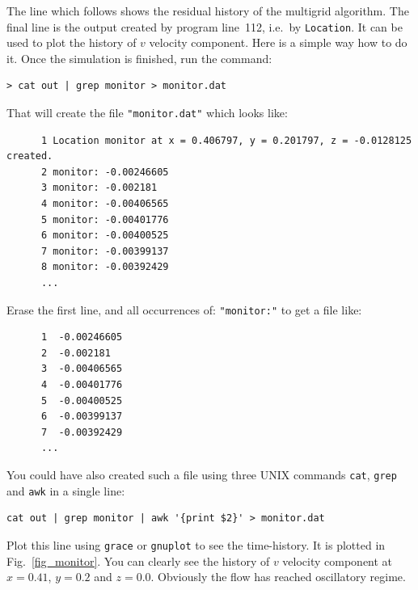 The line which follows shows the residual history of the multigrid algorithm.
The final line is the output created by program line~112, i.e.\ by {\tt Location}.
It can be used to plot the history of $v$ velocity component. 
%
Here is 
a simple way how to do it. Once the simulation is finished, run the 
command:
%
\begin{verbatim}
> cat out | grep monitor > monitor.dat
\end{verbatim}
%
That will create the file {\tt "monitor.dat"} which looks like:
%
{\small \begin{verbatim}
      1 Location monitor at x = 0.406797, y = 0.201797, z = -0.0128125 created.
      2 monitor: -0.00246605
      3 monitor: -0.002181
      4 monitor: -0.00406565
      5 monitor: -0.00401776
      6 monitor: -0.00400525
      7 monitor: -0.00399137
      8 monitor: -0.00392429
      ...
\end{verbatim}}
%
Erase the first line, and all occurrences of: {\tt "monitor:"} to get a file like:
%
{\small \begin{verbatim}
      1  -0.00246605
      2  -0.002181
      3  -0.00406565
      4  -0.00401776
      5  -0.00400525
      6  -0.00399137
      7  -0.00392429
      ...
\end{verbatim}}
% 
You could have also created such a file using three UNIX commands {\tt cat},
{\tt grep} and {\tt awk} in a single line:
%
\begin{verbatim}
cat out | grep monitor | awk '{print $2}' > monitor.dat
\end{verbatim}
%
Plot this line using {\tt grace} or {\tt gnuplot} to see the time-history. It
is plotted in Fig.~\ref{fig_monitor}. You can clearly see the history of $v$ velocity
component at $x=0.41$, $y=0.2$ and $z=0.0$. Obviously the flow has reached oscillatory
regime.

